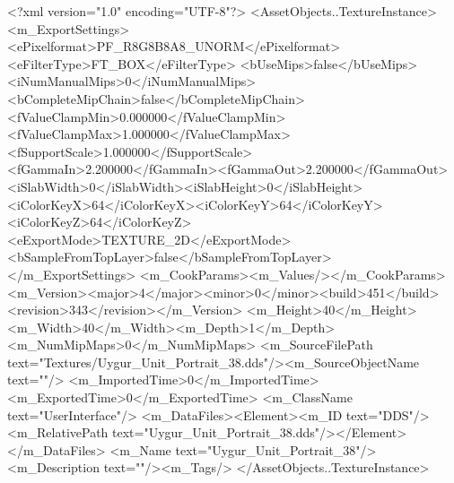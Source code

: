 <?xml version="1.0" encoding="UTF-8"?>
<AssetObjects..TextureInstance>
  <m_ExportSettings>
    <ePixelformat>PF_R8G8B8A8_UNORM</ePixelformat><eFilterType>FT_BOX</eFilterType>
    <bUseMips>false</bUseMips><iNumManualMips>0</iNumManualMips><bCompleteMipChain>false</bCompleteMipChain>
    <fValueClampMin>0.000000</fValueClampMin><fValueClampMax>1.000000</fValueClampMax><fSupportScale>1.000000</fSupportScale>
    <fGammaIn>2.200000</fGammaIn><fGammaOut>2.200000</fGammaOut><iSlabWidth>0</iSlabWidth><iSlabHeight>0</iSlabHeight>
    <iColorKeyX>64</iColorKeyX><iColorKeyY>64</iColorKeyY><iColorKeyZ>64</iColorKeyZ>
    <eExportMode>TEXTURE_2D</eExportMode><bSampleFromTopLayer>false</bSampleFromTopLayer>
  </m_ExportSettings>
  <m_CookParams><m_Values/></m_CookParams>
  <m_Version><major>4</major><minor>0</minor><build>451</build><revision>343</revision></m_Version>
  <m_Height>40</m_Height><m_Width>40</m_Width><m_Depth>1</m_Depth><m_NumMipMaps>0</m_NumMipMaps>
  <m_SourceFilePath text="Textures/Uygur_Unit_Portrait_38.dds"/><m_SourceObjectName text=""/>
  <m_ImportedTime>0</m_ImportedTime><m_ExportedTime>0</m_ExportedTime>
  <m_ClassName text="UserInterface"/>
  <m_DataFiles><Element><m_ID text="DDS"/><m_RelativePath text="Uygur_Unit_Portrait_38.dds"/></Element></m_DataFiles>
  <m_Name text="Uygur_Unit_Portrait_38"/><m_Description text=""/><m_Tags/>
</AssetObjects..TextureInstance>
